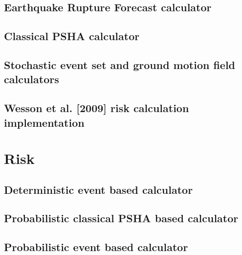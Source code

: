 \documentclass[12pt,a4paper,smallheadings]{scrbook}
\begin{document}
\chapter{Earthquake Rupture Forecast calculator}
	
\chapter{Classical PSHA calculator}
	
\chapter{Stochastic event set and ground motion field calculators}
	
\chapter{Wesson et al. [2009] risk calculation implementation}
	
\part{Risk}
\chapter{Deterministic event based calculator}
	
\chapter{Probabilistic classical PSHA based calculator}
	
\chapter{Probabilistic event based calculator}
	
\end{document}
